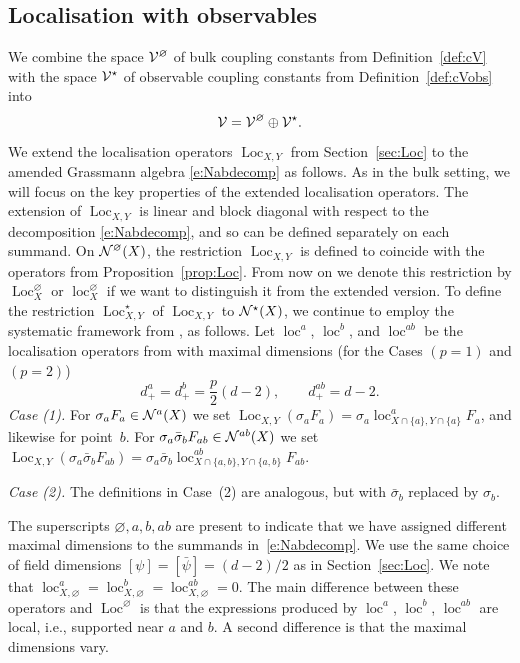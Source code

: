 \documentclass[11pt]{amsart}
\numberwithin{equation}{section}
\numberwithin{theorem}{section}
\newcommand{\1}{{\bf 1}}
\newcommand{\obs}{\star}
\newcommand{\cVbulk}{\cV^\varnothing}
\newcommand{\Loc}{\operatorname{Loc}}
\newcommand{\loc}{\operatorname{loc}}
\begin{document}
\subsection{Localisation with observables}
\label{sec:locobs}

We combine the space $\cVbulk$ of bulk coupling constants
from Definition~\ref{def:cV} 
with the space $\cV^\obs$ of observable coupling constants from
Definition~\ref{def:cVobs} 
into
\begin{equation}
  \cV = \cV^\varnothing \oplus \cV^\obs.
\end{equation}
%
We extend the localisation operators $\Loc_{X,Y}$ from
Section~\ref{sec:Loc} to the amended Grassmann algebra
\eqref{e:Nabdecomp} as follows. As in the bulk setting, we will
focus on the key properties of the extended localisation operators.
The extension of $\Loc_{X,Y}$ is 
linear and block diagonal with respect to the decomposition
\eqref{e:Nabdecomp}, and so can be defined 
separately on each summand. 
On $\mathcal N^\varnothing(X)$, the restriction $\Loc_{X,Y}$ is defined to
coincide with the operators from 
Proposition~\ref{prop:Loc}.
From now on we denote this restriction by $\Loc_X^\varnothing$
or $\loc^{\varnothing}_{X}$ if
we want to distinguish it from the extended version.  To define the
restriction $\Loc^{\obs}_{X,Y}$ of $\Loc_{X,Y}$ to $\cN^\obs(X)$, we
continue to employ the systematic framework from \cite[Section~1.7]{MR3332939},
as follows. Let $\loc^a$, $\loc^b$, and $\loc^{ab}$ be the localisation
operators from \cite[Definition~1.17]{MR3332939}
with maximal dimensions (for the Cases $(p=1)$ and $(p=2)$)
\begin{equation} \label{e:d+obs}
  d_+^{a} = d_+^b = \frac{p}{2}(d-2)
  ,
  \qquad
  d_+^{ab} = d-2.
\end{equation}
%
\noindent\emph{Case (1).}
For $\sigma_a F_a\in \mathcal N^a(X)$ we set $\Loc_{X, Y} (\sigma_a F_a) = \sigma_a \loc^a_{X\cap\{a\}, Y\cap\{a\}} F_a$, and likewise for point~$b$.
For $\sigma_a\bar\sigma_b F_{ab} \in \mathcal N^{ab}(X)$ we set $\Loc_{X, Y} (\sigma_a\bar\sigma_b F_{ab}) = \sigma_a \bar\sigma_b \loc^{ab}_{X\cap\{a,b\}, Y\cap\{a,b\}} F_{ab}$.

\smallskip\noindent\emph{Case (2).}
The definitions in Case~(2) are analogous,
but with $\bar\sigma_{b}$ replaced by $\sigma_{b}$.
\smallskip

The superscripts $\varnothing,a,b,ab$ are present to indicate that we have assigned
different maximal dimensions to the summands in~\eqref{e:Nabdecomp}.
%
We use the same choice of field dimensions $[\psi]=[\bar\psi]=(d-2)/2$
as in Section~\ref{sec:Loc}.
%
We note that $\loc^a_{X, \varnothing}=\loc^b_{X,\varnothing}=\loc^{ab}_{X,\varnothing}=0$.  
%
%
The main difference between these operators
and $\Loc^\varnothing$ is that
the expressions produced by $\loc^a$, $\loc^b$, $\loc^{ab}$ are local, i.e.,
supported near $a$ and $b$. A second difference is that
the maximal dimensions vary.
\end{document}
